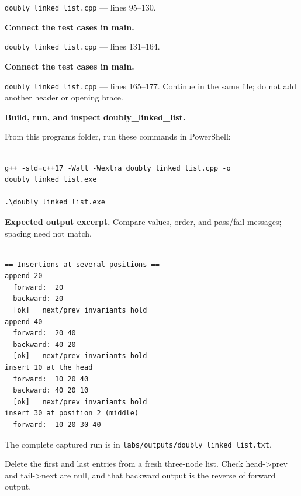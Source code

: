 \texttt{doubly\_linked\_list.cpp} --- lines 95--130.




\tcbbreak

\begin{utpsteps}\setcounter{enumi}{4}\item \textbf{Connect the test cases in main.}\end{utpsteps}

\texttt{doubly\_linked\_list.cpp} --- lines 131--164.




\tcbbreak

\begin{utpsteps}\setcounter{enumi}{5}\item \textbf{Connect the test cases in main.}\end{utpsteps}

\texttt{doubly\_linked\_list.cpp} --- lines 165--177. Continue in the same file; do not add another header or opening brace.




\tcbbreak

\textbf{Build, run, and inspect doubly\_linked\_list.}

From this program\textquotesingle s folder, run these commands in PowerShell:

\begin{lstlisting}[style=utpterminal,language={}]

g++ -std=c++17 -Wall -Wextra doubly_linked_list.cpp -o doubly_linked_list.exe

.\doubly_linked_list.exe

\end{lstlisting}

\textbf{Expected output excerpt.} Compare values, order, and pass/fail messages; spacing need not match.

\begin{lstlisting}[style=utpterminal,language={}]

== Insertions at several positions ==
append 20
  forward:  20 
  backward: 20 
  [ok]   next/prev invariants hold
append 40
  forward:  20 40 
  backward: 40 20 
  [ok]   next/prev invariants hold
insert 10 at the head
  forward:  10 20 40 
  backward: 40 20 10 
  [ok]   next/prev invariants hold
insert 30 at position 2 (middle)
  forward:  10 20 30 40

\end{lstlisting}

The complete captured run is in \texttt{labs/outputs/doubly\_linked\_list.txt}.

\begin{tryit}

Delete the first and last entries from a fresh three-node list. Check head->prev and tail->next are null, and that backward output is the reverse of forward output.

\end{tryit}
